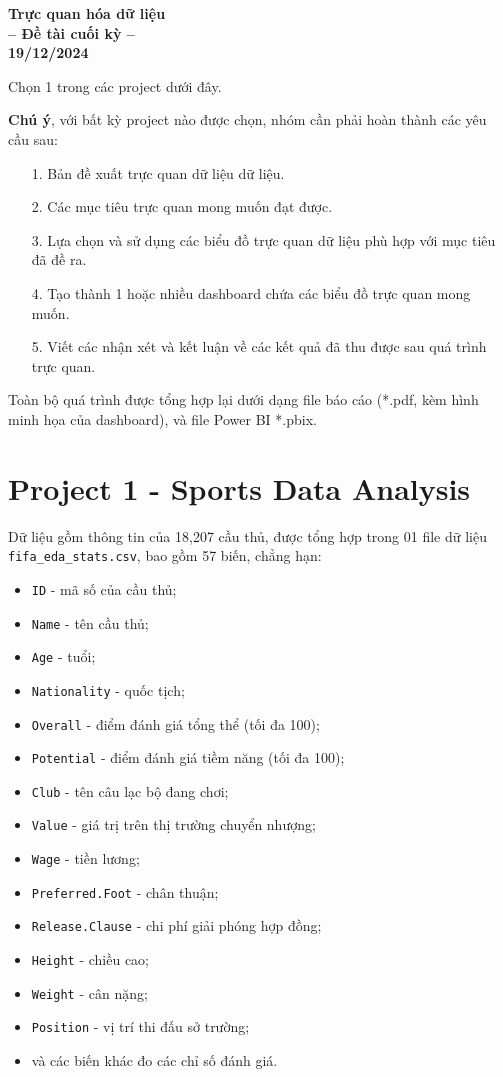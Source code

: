 \documentclass[12pt]{article}
\theoremstyle{definition} \newtheorem{exercise}[theorem]{\bf Bài tập}
\begin{document}
	
\begin{center}
	\textbf{\Large Trực quan hóa dữ liệu} \\
	\vspace{0.5cm}
	\textbf{-- Đề tài cuối kỳ --} \\
	\vspace{0.5cm}
	\textbf{19/12/2024}
\end{center}

\vspace{0.5cm}

\noindent
Chọn 1 trong các project dưới đây.

\noindent
\textbf{Chú ý}, với bất kỳ project nào được chọn, nhóm cần phải hoàn thành các yêu cầu sau:
\begin{itemize}
\item[1.] Bản đề xuất trực quan dữ liệu dữ liệu.
\item[2.] Các mục tiêu trực quan mong muốn đạt được.
\item[3.] Lựa chọn và sử dụng các biểu đồ trực quan dữ liệu phù hợp với mục tiêu đã đề ra. 
\item[4.] Tạo thành 1 hoặc nhiều dashboard chứa các biểu đồ trực quan mong muốn.
\item[5.] Viết các nhận xét và kết luận về các kết quả đã thu được sau quá trình trực quan.
\end{itemize}
Toàn bộ quá trình được tổng hợp lại dưới dạng file báo cáo (*.pdf, kèm hình minh họa của dashboard), và file Power BI *.pbix.


\section*{Project 1 - Sports Data Analysis}
Dữ liệu gồm thông tin của 18,207 cầu thủ, được tổng hợp trong 01 file dữ liệu \texttt{fifa\_eda\_stats.csv}, bao gồm 57 biến, chẳng hạn:

\begin{itemize}
\item \texttt{ID} - mã số của cầu thủ;
\item \texttt{Name} - tên cầu thủ;
\item \texttt{Age} - tuổi;
\item \texttt{Nationality} - quốc tịch;
\item \texttt{Overall} - điểm đánh giá tổng thể (tối đa 100);
\item \texttt{Potential} - điểm đánh giá tiềm năng (tối đa 100);
\item \texttt{Club} - tên câu lạc bộ đang chơi;
\item \texttt{Value} - giá trị trên thị trường chuyển nhượng;
\item \texttt{Wage} - tiền lương;
\item \texttt{Preferred.Foot} - chân thuận;
\item \texttt{Release.Clause} - chi phí giải phóng hợp đồng;
\item \texttt{Height} - chiều cao;
\item \texttt{Weight} - cân nặng;
\item \texttt{Position} - vị trí thi đấu sở trường;
\item và các biến khác đo các chỉ số đánh giá.
\end{itemize}
\end{document}
